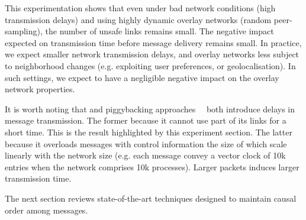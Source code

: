 This experimentation shows that even under bad network conditions (high
transmission delays) and using highly dynamic overlay networks (random
peer-sampling), the number of unsafe links remains small. The negative impact
expected on transmission time before message delivery remains small. In
practice, we expect smaller network transmission delays, and overlay networks
less subject to neighborhood changes (e.g. exploiting user preferences, or
geolocalisation). In such settings, we expect \CBROADCAST to have a negligible
negative impact on the overlay network properties.

It is worth noting that \CBROADCAST and piggybacking
approaches~\cite{almeida2008interval,fidge1988timestamps,mattern1989virtual,singhal1992efficient}~\cite{birman1987reliable,hadzilacos1993fault,mostefaoui2017probabilistic}
both introduce delays in message transmission. The former because it cannot use
part of its links for a short time. This is the result highlighted by this
experiment section.  The latter because it overloads messages with control
information the size of which scale linearly with the network size (e.g. each
message convey a vector clock of 10k entries when the network comprises 10k
processes).  Larger packets induces larger transmission time.

The next section reviews state-of-the-art techniques designed to maintain causal
order among messages.

